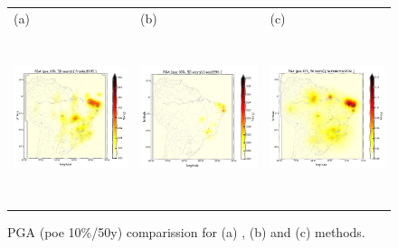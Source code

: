 \documentclass[draft, grl]{agutex}
\begin{document}



\begin{figure}
	\begin{center}
	\begin{table}[H]
		\begin{tabular}{ p{}
						 p{}
						 p{} }
		\footnotesize(a) &
		\footnotesize(b) &
		\footnotesize(c)
		\\
		\includegraphics[height=5cm]{z_img_pga_frankel}  &
		\includegraphics[height=5cm]{z_img_pga_woo} &
		\includegraphics[height=5cm]{z_img_pga_helmstetter}
		\end{tabular}
	\end{table}
	\caption{PGA (poe 10\%/50y) comparission for (a) \citet{frankel_1995}, (b) \citet{woo_1996} and (c) \citet{helmstetter_2012} methods.}
	\label{fig_pga}
	\end{center}
\end{figure}
\end{document}
